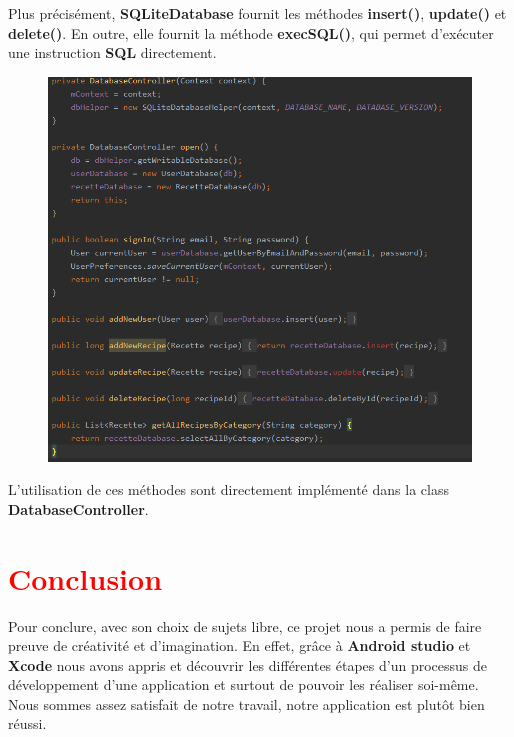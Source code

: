 \documentclass{article}
\begin{document}
Plus précisément, \textbf{SQLiteDatabase} fournit les méthodes \textbf{insert()}, \textbf{update()} et \textbf{delete()}. En outre, elle fournit la méthode \textbf{execSQL()}, qui permet d'exécuter une instruction \textbf{SQL} directement.\\

\begin{figure}
    \center
    \includegraphics[scale=0.7]{insert_update_delete.png}
\end{figure}

L'utilisation de ces méthodes sont directement implémenté dans la class \textbf{DatabaseController}.

\newpage


\section{\textcolor{red}{Conclusion}}

Pour conclure, avec son choix de sujets libre, ce projet nous a permis de faire preuve de créativité et d’imagination. En effet, grâce à \textbf{Android studio} et \textbf{Xcode} nous avons appris et découvrir les différentes étapes d’un processus de développement d’une application et surtout de pouvoir les réaliser soi-même. Nous sommes assez satisfait de notre travail, notre application est plutôt bien
réussi.
\end{document}
